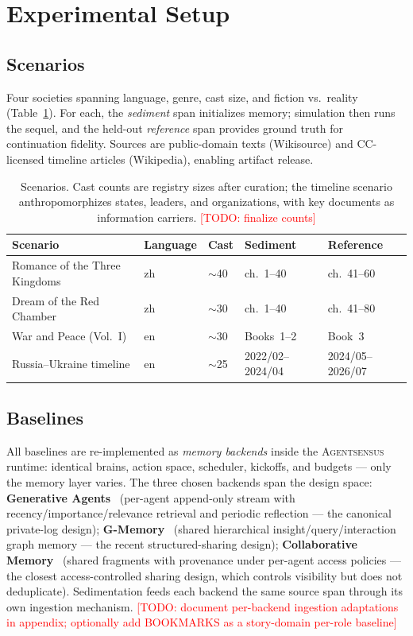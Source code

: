 \documentclass[11pt]{article}
\newcommand{\sysname}{\textsc{Agentsensus}}
\newcommand{\todo}[1]{\textcolor{red}{[TODO: #1]}}
\begin{document}
\section{Experimental Setup}
\label{sec:setup}

\subsection{Scenarios}
\label{sec:scenarios}
Four societies spanning language, genre, cast size, and fiction vs.\ reality
(Table~\ref{tab:scenarios}). For each, the \emph{sediment} span initializes
memory; simulation then runs the sequel, and the held-out \emph{reference} span
provides ground truth for continuation fidelity. Sources are public-domain
texts (Wikisource) and CC-licensed timeline articles (Wikipedia), enabling
artifact release.

\begin{table}[t]
\centering\small
\begin{tabular}{lllll}
\toprule
Scenario & Language & Cast & Sediment & Reference \\
\midrule
Romance of the Three Kingdoms & zh & $\sim$40 & ch.~1--40 & ch.~41--60 \\
Dream of the Red Chamber & zh & $\sim$30 & ch.~1--40 & ch.~41--80 \\
War and Peace (Vol.~I) & en & $\sim$30 & Books~1--2 & Book~3 \\
Russia--Ukraine timeline & en & $\sim$25 & 2022/02--2024/04 & 2024/05--2026/07 \\
\bottomrule
\end{tabular}
\caption{Scenarios. Cast counts are registry sizes after curation; the
timeline scenario anthropomorphizes states, leaders, and organizations, with
key documents as information carriers. \todo{finalize counts}}
\label{tab:scenarios}
\end{table}

\subsection{Baselines}
\label{sec:baselines}
All baselines are re-implemented as \emph{memory backends} inside the \sysname{}
runtime: identical brains, action space, scheduler, kickoffs, and budgets ---
only the memory layer varies. The three chosen backends span the design space:
\textbf{Generative Agents}~\cite{park2023generative} (per-agent append-only
stream with recency/importance/relevance retrieval and periodic reflection ---
the canonical private-log design);
\textbf{G-Memory}~\cite{gmemory2025} (shared hierarchical
insight/query/interaction graph memory --- the recent structured-sharing
design);
\textbf{Collaborative Memory}~\cite{collabmem2025} (shared fragments with
provenance under per-agent access policies --- the closest access-controlled
sharing design, which controls visibility but does not deduplicate).
Sedimentation feeds each backend the same source span through its own
ingestion mechanism. \todo{document per-backend ingestion adaptations in
appendix; optionally add BOOKMARKS as a story-domain per-role baseline}
\end{document}
